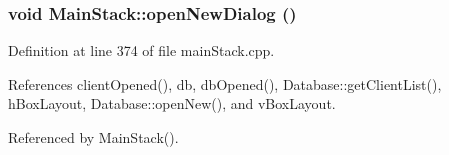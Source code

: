 \hypertarget{classMainStack_k1}{
\subsubsection[openNewDialog]{\setlength{\rightskip}{0pt plus 5cm}void Main\-Stack::open\-New\-Dialog ()}}
\label{classMainStack_k1}


Definition at line 374 of file main\-Stack.cpp.

References client\-Opened(), db, db\-Opened(), Database::get\-Client\-List(), h\-Box\-Layout, Database::open\-New(), and v\-Box\-Layout.

Referenced by Main\-Stack().

